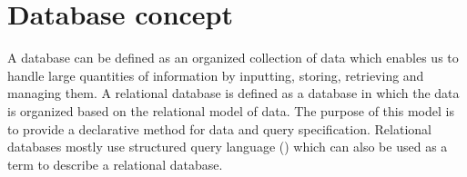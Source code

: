 \newcommand{\fwname}{\texttt{\_fw\_name}}
\newcommand{\surrogateModel}{\texttt{surrogate\_model}}
\newcommand{\surrogateFunction}{\texttt{surrogate\_function}}
\newcommand{\pZero}{\texttt{p0}}
\newcommand{\rhoZero}{\texttt{rho0}}
\newcommand{\pOneByPzero}{\texttt{p1Byp0}}
\newcommand{\diameter}{\texttt{D}}
\newcommand{\id}{\texttt{\_id}}
\newcommand{\cls}{\texttt{\_cls}}
\newcommand{\inputs}{\texttt{inputs}}
\newcommand{\outputs}{\texttt{outputs}}
\newcommand{\fitData}{\texttt{fitData}}
\newcommand{\Min}{\texttt{min}}
\newcommand{\Max}{\texttt{max}}
\newcommand{\argPos}{\texttt{argPos}}
\newcommand{\params}{\texttt{parameters}}
\newcommand{\paramOne}{\texttt{param1}}
\newcommand{\paramTwo}{\texttt{param2}}
\newcommand{\flowRate}{\texttt{flowRate}}
\newcommand{\libraryName}{\texttt{libraryName}}
\newcommand{\functionName}{\texttt{libraryName}}
\newcommand{\Ccode}{\texttt{Ccode}}
\newcommand{\exactTask}{\texttt{exactTask}}
\newcommand{\inheritedInputs}{\texttt{inherited\_inputs}}
\newcommand{\initializationStrategy}{\texttt{initializationStrategy}}
\newcommand{\outofBoundsStrategy}{\texttt{outOfBoundsStrategy}}
\newcommand{\ParameterfittingStrategy}{\texttt{ParameterFittingStrategy}}
\newcommand{\improveErrorStrategy}{\texttt{improveErrorStrategy}}
\newcommand{\initialPoints}{\texttt{initialPoints}}
\newcommand{\nSamples}{\texttt{nSamples}}
\newcommand{\nNewPoints}{\texttt{nNewPoints}}
\newcommand{\maxerror}{\texttt{maxerror}}
\newcommand{\maxIterations}{\texttt{maxIterations}}
\newcommand{\testDataPercentage}{\texttt{testDataPercentage}}
\newcommand{\outsidePoint}{\texttt{outsidePoint}}
\newcommand{\surrFunction}{\texttt{surrogateFunction}}
\newcommand{\tst}{\texttt{test}}
\newcommand{\lcl}{\texttt{local}}
\newcommand{\fireworks}{\texttt{fireworks}}
\newcommand{\sysIndex}{\texttt{system.indexes}}
\newcommand{\catOne}{\texttt{cat\_1.}}
\section{Database concept}
    \label{sec:database}
%
A database can be defined as an organized collection of data which
enables us to handle large quantities of information by inputting, storing,
retrieving and managing them.  A relational database is defined as a database in
which the data is organized based on the relational model of data.
\cite{codd_and_edgar_1970} The purpose of this model is to provide a declarative
method for data and query specification.  Relational databases mostly use
structured query language ({\SQL}) which can also be used as a term to describe
a relational database.

